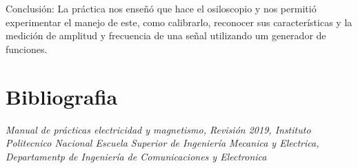 \documentclass[11pt]{article}
\begin{document}
\begin{multicols}{2}
			Conclusión: La práctica nos enseñó que hace el osiloscopio y nos permitió experimentar el manejo de este,  como calibrarlo, reconocer sus características y la medición de amplitud y frecuencia de una señal utilizando um generador de funciones.												

\section{Bibliografia}

\textit{Manual de prácticas electricidad y magnetismo, Revisión 2019, Instituto Politecnico Nacional Escuela Superior de Ingeniería Mecanica y Electrica, Departamentp de Ingeniería de Comunicaciones y Electronica} 


\end{multicols}
\end{document}
